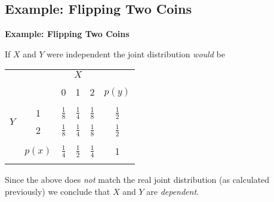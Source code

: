 \documentclass[compress]{beamer}        %
\makeatletter
\newcommand{\tcb}{\textcolor{beamer@blendedblue}}
\makeatother
\begin{document}
\subsection{Example: Flipping Two Coins}
\begin{frame}{\bf \tcb{Example: Flipping Two Coins}}

If $X$ and $Y$ were independent the joint distribution \emph{would} be
\begin{center}
\begin{tabular}{c|c|ccc|c|}
\multicolumn{2}{c}{} & \multicolumn{3}{c}{$X$} & \multicolumn{1}{c}{}\\
\cline{2-6}
&&&&&\\[-0.4cm]
&&                          0 & 1 & 2 & $p(y)$\\
\cline{2-6}
&&&&&\\[-0.3cm]
\multirow{2}{*}{$Y$} & 1 & $\frac{1}{8}$ &  $\frac{1}{4}$ & $\frac{1}{8}$ & $\frac{1}{2}$ \\[0.1cm]
                     & 2 & $\frac{1}{8}$           &  $\frac{1}{4}$  & $\frac{1}{8}$ & $\frac{1}{2}$ \\[0.1cm]
\cline{2-6}
&&&&&\\[-0.3cm]
& $p(x)$ & $\frac{1}{4}$ & $\frac{1}{2}$ & $\frac{1}{4}$ & 1 \\[0.1cm]
\cline{2-6}
\multicolumn{6}{c}{}
\end{tabular}
\end{center}
Since the above does \emph{not} match the real joint distribution (as calculated previously) we conclude that $X$ and $Y$ are \emph{dependent}.

\end{frame}
\end{document}
